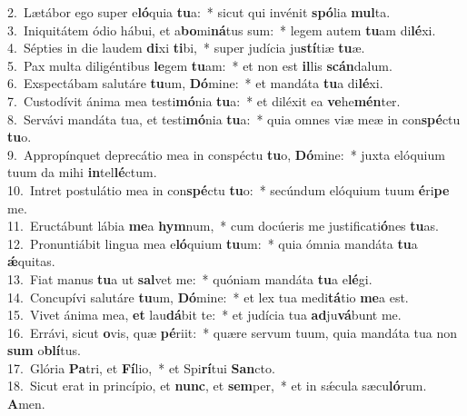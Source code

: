 {2.~}Lætábor ego super e\textbf{ló}quia \textbf{tu}a:~* sicut qui invénit \textbf{spó}lia \textbf{mul}ta.\\
{3.~}Iniquitátem ódio hábui, et a\textbf{bo}mi\textbf{ná}tus sum:~* legem autem \textbf{tu}am di\textbf{lé}xi.\\
{4.~}Sépties in die laudem \textbf{di}xi \textbf{ti}bi,~* super judícia ju\textbf{stí}tiæ \textbf{tu}æ.\\
{5.~}Pax multa diligéntibus \textbf{le}gem \textbf{tu}am:~* et non est \textbf{il}lis \textbf{scán}dalum.\\
{6.~}Exspectábam salutáre \textbf{tu}um, \textbf{Dó}mine:~* et mandáta \textbf{tu}a di\textbf{lé}xi.\\
{7.~}Custodívit ánima mea testi\textbf{mó}nia \textbf{tu}a:~* et diléxit ea \textbf{ve}he\textbf{mén}ter.\\
{8.~}Servávi mandáta tua, et testi\textbf{mó}nia \textbf{tu}a:~* quia omnes viæ meæ in con\textbf{spé}ctu \textbf{tu}o.\\
{9.~}Appropínquet deprecátio mea in conspéctu \textbf{tu}o, \textbf{Dó}mine:~* juxta elóquium tuum da mihi \textbf{in}tel\textbf{lé}ctum.\\
{10.~}Intret postulátio mea in con\textbf{spé}ctu \textbf{tu}o:~* secúndum elóquium tuum \textbf{é}ri\textbf{pe} me.\\
{11.~}Eructábunt lábia \textbf{me}a \textbf{hym}num,~* cum docúeris me justificati\textbf{ó}nes \textbf{tu}as.\\
{12.~}Pronuntiábit lingua mea e\textbf{ló}quium \textbf{tu}um:~* quia ómnia mandáta \textbf{tu}a \textbf{ǽ}quitas.\\
{13.~}Fiat manus \textbf{tu}a ut \textbf{sal}vet me:~* quóniam mandáta \textbf{tu}a e\textbf{lé}gi.\\
{14.~}Concupívi salutáre \textbf{tu}um, \textbf{Dó}mine:~* et lex tua medi\textbf{tá}tio \textbf{me}a est.\\
{15.~}Vivet ánima mea, \textbf{et} lau\textbf{dá}bit te:~* et judícia tua \textbf{ad}ju\textbf{vá}bunt me.\\
{16.~}Errávi, sicut \textbf{o}vis, quæ \textbf{pé}riit:~* quære servum tuum, quia mandáta tua non \textbf{sum} o\textbf{blí}tus.\\
{17.~}Glória \textbf{Pa}tri, et \textbf{Fí}lio,~* et Spi\textbf{rí}tui \textbf{San}cto.\\
{18.~}Sicut erat in princípio, et \textbf{nunc}, et \textbf{sem}per,~* et in sǽcula sæcu\textbf{ló}rum. \textbf{A}men.\\
